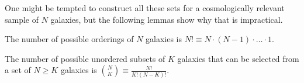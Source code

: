 
One might be tempted to construct all these sets for a cosmologically relevant sample of $N$ galaxies, but the following lemmas show why that is impractical.

\begin{lemma}\label{lem:permutations}
	The number of possible orderings of $N$ galaxies is ${N! \equiv N \cdot (N - 1) \cdot \dots \cdot 1}$.
\end{lemma}

\begin{lemma}\label{lem:combinations}
	The number of possible unordered subsets of $K$ galaxies that can be selected from a set of $N \geq K$ galaxies is ${\binom{N}{K} \equiv \frac{N!}{K! (N - K)!}}$.
\end{lemma}

